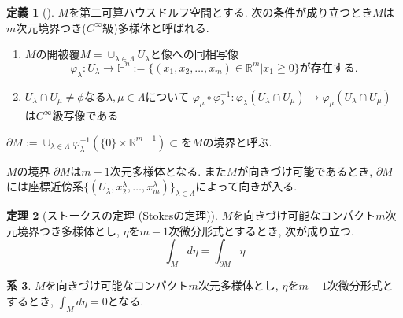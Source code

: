 \documentclass[dvipdfmx,a4paper,11pt]{article}
\newcommand{\R}{\mathbb{R}}
\theoremstyle{definition}
\newtheorem{thm}{定理}
\newtheorem{cor}[thm]{系}
\newtheorem{dfn}[thm]{定義}
\begin{document}
    \begin{tcolorbox}[
    colback = white,
    colframe = green!35!black,
    fonttitle = \bfseries,
    breakable = true]
    \begin{dfn}[]
    $M$を第二可算ハウスドルフ空間とする. 次の条件が成り立つとき$M$は$m$次元境界つき($C^{\infty}$級)多様体と呼ばれる.
     \begin{enumerate}
     \setlength{\parskip}{0cm}
  \setlength{\itemsep}{2pt} 
     \item $M$の開被覆$M = \cup_{\lambda \in \Lambda} U_{\lambda}$と像への同相写像
     $$
     \varphi_{\lambda} : U_{\lambda} \rightarrow \mathbb{H}^n := \{ (x_1, x_2, \ldots, x_m) \in \R^m | x_1 \geqq 0\}
     \text{が存在する.}
     $$
     \item $U_\lambda \cap U_\mu \neq \phi$なる$\lambda, \mu \in \Lambda$について
    $
   \varphi_\mu\circ \varphi_{\lambda}^{-1} : \varphi_{\lambda}(U_\lambda \cap U_\mu) \rightarrow \varphi_{\mu}(U_\lambda \cap U_\mu) 
    $
    は$C^{\infty}$級写像である
     \end{enumerate}
 $\partial M := \cup_{\lambda \in \Lambda} \varphi_{\lambda}^{-1}(\{ 0\} \times \R^{m-1}) \subset $を$M$の境界と呼ぶ.
    \end{dfn}
    \end{tcolorbox}   
$M$の境界 $\partial M$は$m-1$次元多様体となる. また$M$が向きづけ可能であるとき, $\partial M$には座標近傍系$\{(U_\lambda, x_{2}^{\lambda}, \ldots, x_{m}^{\lambda})\}_{\lambda \in \Lambda}$によって向きが入る.

  \begin{tcolorbox}[
    colback = white,
    colframe = green!35!black,
    fonttitle = \bfseries,
    breakable = true]
\begin{thm}[ストークスの定理 (Stokesの定理)]
$M$を向きづけ可能なコンパクト$m$次元境界つき多様体とし, $\eta$を$m-1$次微分形式とするとき, 次が成り立つ. 
$$
\int_{M} d \eta = \int_{\partial M} \eta 
$$
    \end{thm}
    \end{tcolorbox} 
    
    \begin{tcolorbox}[
    colback = white,
    colframe = green!35!black,
    fonttitle = \bfseries,
    breakable = true]
\begin{cor}
$M$を向きづけ可能なコンパクト$m$次元多様体とし, $\eta$を$m-1$次微分形式とするとき, $\int_{M} d \eta =0 $となる.    
\end{cor}
    \end{tcolorbox} 
\end{document}

